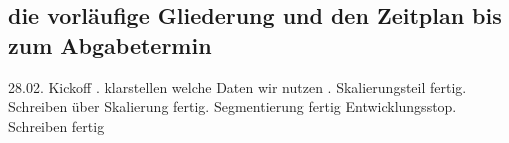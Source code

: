 \documentclass{article}
\begin{document}
 \subsection{die vorläufige Gliederung und den Zeitplan bis zum Abgabetermin}
 28.02. Kickoff . klarstellen welche Daten wir nutzen . Skalierungsteil fertig. Schreiben über Skalierung fertig. Segmentierung fertig Entwicklungsstop. Schreiben fertig
\end{document}
